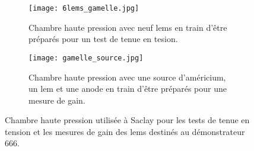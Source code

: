             \begin{figure}[htpb]
                \begin{subfigure}[t]{0.48\textwidth}
                    \texttt{[image: 6lems\_gamelle.jpg]}
                    \caption{Chambre haute pression avec neuf \glspl{lem} en train d'être préparés pour un test de tenue en tesion.}
                    \label{fig::6lems_gamelle}
                \end{subfigure}
                \hfill
                \begin{subfigure}[t]{0.48\textwidth}
                    \texttt{[image: gamelle\_source.jpg]}
                    \caption{Chambre haute pression avec une source d'américium, un \gls{lem} et une anode en train d'être préparés pour une mesure de gain.}
                    \label{fig::gamelle_source}
                \end{subfigure}
                \caption[Chambre haute pression]{Chambre haute pression utilisée à Saclay pour les tests de tenue en tension et les mesures de gain des \glspl{lem} destinés au démonstrateur 666.}
                \label{fig::gamelle}
            \end{figure}

